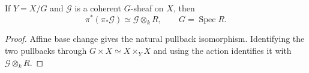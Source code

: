 \begin{corollary}
\label{mumford-cor-quotient-sheaf-base-change}
If $Y=X/G$ and $\mathcal G$ is a coherent $G$-sheaf on $X$, then
\[
\pi^*(\pi_*\mathcal G)\simeq\mathcal G\otimes_kR,
\qquad G=\operatorname{Spec}R.
\]
\end{corollary}
\begin{proof}
Affine base change gives the natural pullback isomorphism. Identifying the
two pullbacks through $G\times X\simeq X\times_YX$ and using the action
identifies it with $\mathcal G\otimes_kR$.
\end{proof}
